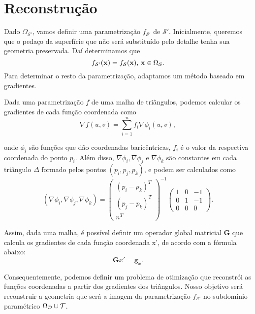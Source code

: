 
\section{Reconstrução}

Dado $\Omega_{\mathcal{S}'}$, vamos definir uma parametrização $f_{\mathcal{S}'}$ de $\mathcal{S}'$. Inicialmente, queremos que o pedaço da superfície que não será substituído pelo detalhe tenha sua geometria preservada. Daí determinamos que 
\begin{equation}
f_{\mathcal{S}'}(\mathbf{x}) = f_{\super}(\mathbf{x}), \, \mathbf{x} \in \Omega_\super.
\label{initeq}
\end{equation}
 Para determinar o resto da parametrização, adaptamos um método baseado em gradientes. 

Dada uma parametrização $f$ de uma malha de triângulos, podemos calcular os gradientes de cada função coordenada como 
$$\nabla f(u,v) = \sum_{i=1}^n f_i \nabla \phi_i(u,v),$$

onde $\phi_i$ são funções que dão coordenadas baricêntricas, $f_i$ é o valor da respectiva coordenada do ponto $p_i$. Além disso, $\nabla \phi_i, \nabla \phi_j$ e $\nabla \phi_k$ são constantes em cada triângulo $\Delta$ formado pelos pontos $(p_i,p_j,p_k)$, e podem ser calculados como
$$(\nabla \phi_i, \nabla \phi_j, \nabla \phi_k) =   
\left( \begin{array}{c}
(p_i-p_k)^T \\
(p_j-p_k)^T \\
n^T \end{array} \right)^{-1}
 \left( \begin{array}{ccc}
1 & 0 & -1 \\
0 & 1 & -1 \\
0 & 0 & 0 \end{array} \right).$$ 

Assim, dada uma malha, é possível definir um operador global matricial $\mathbf{G}$ que calcula os gradientes de cada função coordenada x', de acordo com a fórmula abaixo:
\begin{equation}
\mathbf{G}x' = \mathbf{g}_x. 
\label{grad}
\end{equation}

Consequentemente, podemos definir um problema de otimização que reconstrói as funções coordenadas a partir dos gradientes dos triângulos. Nosso objetivo será reconstruir a geometria que será a imagem da parametrização $f_{\mathcal{S}'}$ no subdomínio paramétrico $\Omega_{\mathcal{D}} \cup \mathcal{T}$. 

